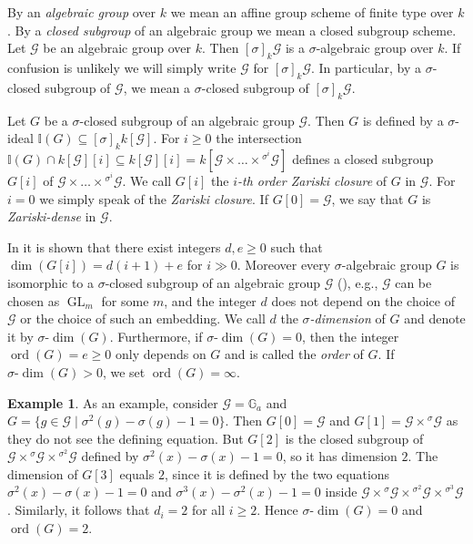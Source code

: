 \documentclass[oneside,reqno]{amsart}
\theoremstyle{definition}
\newtheorem{ex}[theo]{Example}
\newcommand{\G}{\mathcal{G}}
\newcommand{\Gl}{\operatorname{GL}}
\newcommand{\sdim}{\sigma\text{-}\dim}
\newcommand{\ord}{\operatorname{ord}}
\newcommand{\s}{\sigma}
\newcommand{\I}{\mathbb{I}}
\newcommand{\hsi}{^{\sigma^i}\!}
\begin{document}
By an \emph{algebraic group} over $k$ we mean an affine group scheme of finite type over $k$. By a \emph{closed subgroup} of an algebraic group we mean a closed subgroup scheme. 
Let $\G$ be an algebraic group over $k$. %
Then $[\s]_k\G$ is a $\s$-algebraic group over $k$. If confusion is unlikely we will simply write $\G$ for $[\s]_k\G$. In particular, by a $\s$-closed subgroup of $\G$, we mean a $\s$-closed subgroup of $[\s]_k \G$.

Let $G$ be a $\s$-closed subgroup of an algebraic group $\G$. Then $G$ is defined by a $\s$-ideal $\I(G)\subseteq [\s]_k k[\G]$. For $i\geq 0$ the intersection $\I(G)\cap k[\G][i]\subseteq k[\G][i]=k[\G\times\ldots\times {\hsi\G}]$ defines a closed subgroup $G[i]$ of $\G\times\ldots\times {\hsi\G}$. We call $G[i]$ the \emph{$i$-th order Zariski closure} of $G$ in $\G$. For $i=0$ we simply speak of the \emph{Zariski closure}. If $G[0]=\G$, we say that $G$ is \emph{Zariski-dense} in $\G$.

In \cite[Theorem 3.7]{Wibmer:FinitenessPropertiesOfAffineDifferenceAlgebraicGroups} it is shown that there exist integers $d,e\geq 0$ such that
$\dim(G[i])=d(i+1)+e$ for $i\gg 0$. Moreover every $\s$-algebraic group $G$ is isomorphic to a $\s$-closed subgroup of an algebraic group $\G$ (\cite[Prop. 2.16]{Wibmer:FinitenessPropertiesOfAffineDifferenceAlgebraicGroups}), e.g., $\G$ can be chosen as $\Gl_m$ for some $m$,
and the integer $d$ does not depend on the choice of $\G$ or the choice of such an embedding. We call $d$ the \emph{$\s$-dimension} of $G$ and denote it by $\sdim(G)$. Furthermore, if $\sdim(G)=0$, then the integer $\ord(G)=e\geq 0$ only depends on $G$ and is called the \emph{order} of $G$. If $\sdim(G)>0$, we set $\ord(G)=\infty$.



\begin{ex}
  As an example, consider $\G=\mathbb{G}_a$ and $G=\{g \in \G \mid \s^2(g)-\s(g)-1=0\}$. Then $G[0]=\G$ and $G[1]=\G\times {^\s \G}$ as they do not see the defining equation. But $G[2]$ is the closed subgroup of $\G \times {^\s \G} \times {^{\s^2}\G}$ defined by $\s^2(x)-\s(x)-1=0$, so it has dimension $2$. The dimension of $G[3]$ equals $2$, since it is defined by the two equations $\s^2(x)-\s(x)-1=0$ and $\s^3(x)-\s^2(x)-1=0$ inside  $\G \times {^\s \G} \times {^{\s^2}\G}\times {^{\s^3}\G} $. Similarly, it follows that $d_i=2$ for all $i\geq 2$. Hence $\sdim(G)=0$ and $\ord(G)=2$. 
\end{ex}
\end{document}
